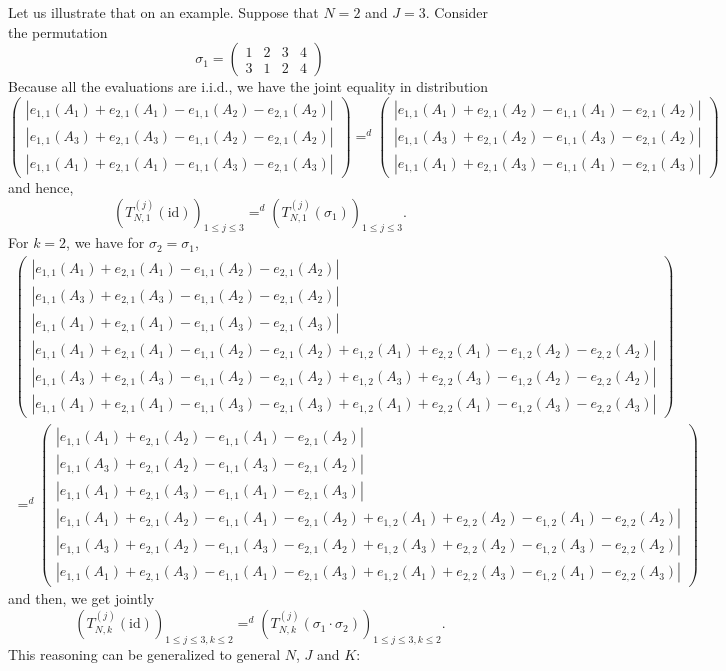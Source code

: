 \documentclass{article}
\theoremstyle{plain}
\theoremstyle{remark}
\newcommand{\1}{\mathbbm{1}}
\newcommand{\id}{\mathrm{id}}
\numberwithin{equation}{section}
\begin{document}
Let us illustrate that on an example. Suppose that $N=2$ and $J=3$.  Consider the permutation 
\[
  \sigma_1 = 
  \begin{pmatrix}
    1 & 2 & 3 & 4\\
    3 & 1 & 2 & 4 
  \end{pmatrix}
\]
Because all the evaluations are i.i.d., we have the joint equality in distribution
$$
\begin{pmatrix}
|e_{1,1}(A_1)+e_{2,1}(A_1)-e_{1,1}(A_2)-e_{2,1}(A_2)| \\
|e_{1,1}(A_3)+e_{2,1}(A_3)-e_{1,1}(A_2)-e_{2,1}(A_2)| \\
|e_{1,1}(A_1)+e_{2,1}(A_1)-e_{1,1}(A_3)-e_{2,1}(A_3)|
 \end{pmatrix} 
=^d
\begin{pmatrix}
|e_{1,1}(A_1)+e_{2,1}(A_2)-e_{1,1}(A_1)-e_{2,1}(A_2)| \\
|e_{1,1}(A_3)+e_{2,1}(A_2)-e_{1,1}(A_3)-e_{2,1}(A_2)| \\
|e_{1,1}(A_1)+e_{2,1}(A_3)-e_{1,1}(A_1)-e_{2,1}(A_3)|
 \end{pmatrix} 
$$
and hence, 
$$(T_{N,1}^{(j)}(\id))_{1\le j\le 3}=^d(T_{N,1}^{(j)}(\sigma_1))_{1\le j\le 3}.$$
For $k=2$, we have for $\sigma_2 = \sigma_1$,
\begin{multline*}
\begin{pmatrix}
|e_{1,1}(A_1)+e_{2,1}(A_1)-e_{1,1}(A_2)-e_{2,1}(A_2)| \\
|e_{1,1}(A_3)+e_{2,1}(A_3)-e_{1,1}(A_2)-e_{2,1}(A_2)| \\
|e_{1,1}(A_1)+e_{2,1}(A_1)-e_{1,1}(A_3)-e_{2,1}(A_3)| \\
|e_{1,1}(A_1)+e_{2,1}(A_1)-e_{1,1}(A_2)-e_{2,1}(A_2)+e_{1,2}(A_1)+e_{2,2}(A_1)-e_{1,2}(A_2)-e_{2,2}(A_2)| \\
|e_{1,1}(A_3)+e_{2,1}(A_3)-e_{1,1}(A_2)-e_{2,1}(A_2)+e_{1,2}(A_3)+e_{2,2}(A_3)-e_{1,2}(A_2)-e_{2,2}(A_2)| \\
|e_{1,1}(A_1)+e_{2,1}(A_1)-e_{1,1}(A_3)-e_{2,1}(A_3)+e_{1,2}(A_1)+e_{2,2}(A_1)-e_{1,2}(A_3)-e_{2,2}(A_3)|
 \end{pmatrix} \\
=^d
\begin{pmatrix}
|e_{1,1}(A_1)+e_{2,1}(A_2)-e_{1,1}(A_1)-e_{2,1}(A_2)| \\
|e_{1,1}(A_3)+e_{2,1}(A_2)-e_{1,1}(A_3)-e_{2,1}(A_2)| \\
|e_{1,1}(A_1)+e_{2,1}(A_3)-e_{1,1}(A_1)-e_{2,1}(A_3)|\\
|e_{1,1}(A_1)+e_{2,1}(A_2)-e_{1,1}(A_1)-e_{2,1}(A_2)+e_{1,2}(A_1)+e_{2,2}(A_2)-e_{1,2}(A_1)-e_{2,2}(A_2)| \\
|e_{1,1}(A_3)+e_{2,1}(A_2)-e_{1,1}(A_3)-e_{2,1}(A_2)+e_{1,2}(A_3)+e_{2,2}(A_2)-e_{1,2}(A_3)-e_{2,2}(A_2)| \\
|e_{1,1}(A_1)+e_{2,1}(A_3)-e_{1,1}(A_1)-e_{2,1}(A_3)+e_{1,2}(A_1)+e_{2,2}(A_3)-e_{1,2}(A_1)-e_{2,2}(A_3)|
 \end{pmatrix} 
\end{multline*}
and then, we get jointly
$$(T_{N,k}^{(j)}(\id))_{1\le j\le 3, k\le 2}=^d(T_{N,k}^{(j)}(\sigma_1\cdot\sigma_2))_{1\le j\le 3, k\le 2}.$$
This reasoning can be generalized to general $N$, $J$ and $K$:
\end{document}
